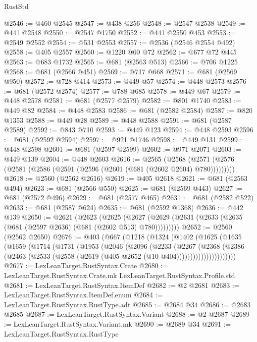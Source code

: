 \begin{lexlean}{RustStd}
\begin{coremodule}
@2546 := @460 @2545
@2547 := @438 @256
@2548 := @2547 @2538
@2549 := @441 @2548
@2550 := @2547 @1750
@2552 := @441 @2550 @453
@2553 := @2549 @2552
@2554 := @531 @2553
@2557 := @2536 (@2546 @2554 @492)
@2558 := @405 @2557
@2560 := @1220 @60 @72
@2562 := @677 @72 @445
@2563 := @683 @1732
@2565 := @681 (@2563 @513)
@2566 := @706 @1225
@2568 := @681 (@2566 @451)
@2569 := @717 @668
@2571 := @681 (@2569 @950)
@2572 := @728 @414
@2573 := @449 @57
@2574 := @448 @2573
@2576 := @681 (@2572 @2574)
@2577 := @788 @685
@2578 := @449 @67
@2579 := @448 @2578
@2581 := @681 (@2577 @2579)
@2582 := @801 @1740
@2583 := @449 @82
@2584 := @448 @2583
@2586 := @681 (@2582 @2584)
@2587 := @820 @1353
@2588 := @449 @28
@2589 := @448 @2588
@2591 := @681 (@2587 @2589)
@2592 := @843 @710
@2593 := @449 @123
@2594 := @448 @2593
@2596 := @681 (@2592 @2594)
@2597 := @921 @1746
@2598 := @449 @131
@2599 := @448 @2598
@2601 := @681 (@2597 @2599)
@2602 := @971 @2071
@2603 := @449 @139
@2604 := @448 @2603
@2616 := @2565
    (@2568 (@2571 (@2576 (@2581 (@2586 (@2591 (@2596 (@2601 (@681 (@2602 @2604) @780)))))))))
@2618 := @2560 (@2562 @2616)
@2619 := @405 @2618
@2621 := @681 (@2563 @494)
@2623 := @681 (@2566 @550)
@2625 := @681 (@2569 @443)
@2627 := @681 (@2572 @496)
@2629 := @681 (@2577 @465)
@2631 := @681 (@2582 @522)
@2633 := @681 (@2587 @624)
@2635 := @681 (@2592 @1368)
@2636 := @442 @139
@2650 := @2621
    (@2623
      (@2625 (@2627 (@2629 (@2631 (@2633 (@2635 (@681 (@2597 @2636) (@681 (@2602 @513) @780)))))))))
@2652 := @2560 (@2562 @2650)
@2676 := @403
    (@667
      (@1218
        (@1324
          (@1402
            (@1625
              (@1635
                (@1659
                  (@1714
                    (@1731
                      (@1953
                        (@2046
                          (@2096
                            (@2233
                              (@2267
                                (@2368
                                  (@2386
                                    (@2463
                                      (@2533
                                        (@2558 (@2619 (@405 @2652 (@10 @404))))))))))))))))))))))
@2677 := LexLeanTarget.RustSyntax.Crate
@2680 := LexLeanTarget.RustSyntax.Crate.mk LexLeanTarget.RustSyntax.Profile.std
@2681 := LexLeanTarget.RustSyntax.ItemDef
@2682 := @2 @2681
@2683 := LexLeanTarget.RustSyntax.ItemDef.enum
@2684 := LexLeanTarget.RustSyntax.RustType.adt
@2685 := @2684 @34
@2686 := @2683 @2685
@2687 := LexLeanTarget.RustSyntax.Variant
@2688 := @2 @2687
@2689 := LexLeanTarget.RustSyntax.Variant.mk
@2690 := @2689 @34
@2691 := LexLeanTarget.RustSyntax.RustType

\end{coremodule}
\end{lexlean}
